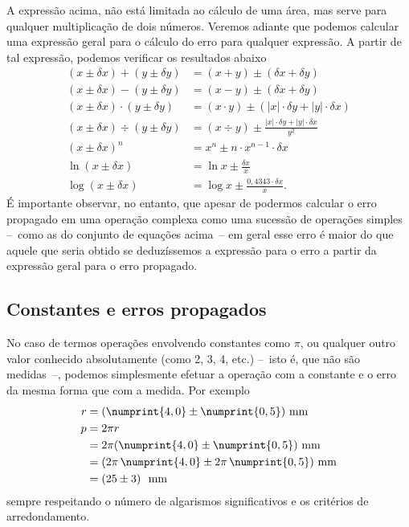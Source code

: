 A expressão acima, não está limitada ao cálculo de uma área, mas serve para qualquer multiplicação de dois números. Veremos adiante que podemos calcular uma expressão geral para o cálculo do erro para qualquer expressão. A partir de tal expressão, podemos verificar os resultados abaixo
\begin{subequations}
\begin{align}
	(x\pm\delta x)+(y\pm\delta y) &= (x+y)\pm(\delta x+\delta y) \\
	(x\pm\delta x)-(y\pm\delta y) &= (x-y)\pm(\delta x + \delta y) \\
	(x\pm\delta x) \cdot (y\pm\delta y) &= (x\cdot y)\pm (|x|\cdot\delta y + |y|\cdot\delta x) \\
	(x\pm \delta x)\div(y\pm\delta y) &= (x\div y)\pm\frac{|x|\cdot\delta y+|y|\cdot\delta x}{y^2} \\
	(x\pm\delta x)^n &= x^n\pm n \cdot x^{n-1}\cdot\delta x \\
	\ln(x\pm\delta x) &= \ln x \pm \frac{\delta x}{x} \\
	\log (x\pm\delta x) &= \log x \pm \frac{0,4343\cdot\delta x}{x}.
\end{align}
\end{subequations}
%
É importante observar, no entanto, que apesar de podermos calcular o erro propagado em uma operação complexa como uma sucessão de operações simples --~como as do conjunto de equações acima~-- em geral esse erro é maior do que aquele que seria obtido se deduzíssemos a expressão para o erro a partir da expressão geral para o erro propagado.

\subsection{Constantes e erros propagados}

No caso de termos operações envolvendo constantes como $\pi$, ou qualquer outro valor conhecido absolutamente (como 2, 3, 4, etc.) --~isto é, que não são medidas~--, podemos simplesmente efetuar a operação com a constante e o erro da mesma forma que com a medida. Por exemplo
\begin{align}
     r &= (\numprint{4,0} \pm \numprint{0,5})\textrm{~mm} \\
     p &= 2\pi r \\
     &= 2\pi(\numprint{4,0} \pm \numprint{0,5})\textrm{~mm} \\
     &= (2\pi\,\numprint{4,0} \pm 2\pi\,\numprint{0,5})\textrm{~mm} \\
     &= (25 \pm 3)~\textrm{~mm}
\end{align}
%
sempre respeitando o número de algarismos significativos e os critérios de arredondamento.


